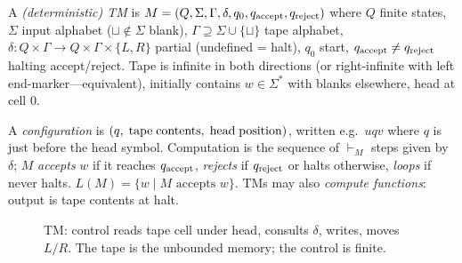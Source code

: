 \begin{definition}
A \emph{(deterministic) TM} is $M=(Q,\Sigma,\Gamma,\delta,q_0,q_{\rm accept},q_{\rm reject})$ where $Q$ finite states, $\Sigma$ input alphabet ($\sqcup\notin\Sigma$ blank), $\Gamma\supseteq\Sigma\cup\{\sqcup\}$ tape alphabet, $\delta:Q\times\Gamma\to Q\times\Gamma\times\{L,R\}$ partial (undefined = halt), $q_0$ start, $q_{\rm accept}\neq q_{\rm reject}$ halting accept/reject. Tape is infinite in both directions (or right-infinite with left end-marker---equivalent), initially contains $w\in\Sigma^*$ with blanks elsewhere, head at cell $0$.
\end{definition}

A \emph{configuration} is $(q,\;{\rm tape\;contents},\;{\rm head\;position})$, written e.g.\ $u q v$ where $q$ is just before the head symbol. Computation is the sequence of $\vdash_M$ steps given by $\delta$; $M$ \emph{accepts} $w$ if it reaches $q_{\rm accept}$, \emph{rejects} if $q_{\rm reject}$ or halts otherwise, \emph{loops} if never halts. $L(M)=\{w\mid M\text{ accepts }w\}$. TMs may also \emph{compute functions}: output is tape contents at halt.

\begin{figure}[h]
\centering
{}
\caption{TM: control reads tape cell under head, consults $\delta$, writes, moves $L/R$. The tape is the unbounded memory; the control is finite.}
\label{fig:tm-schematic}
\end{figure}

